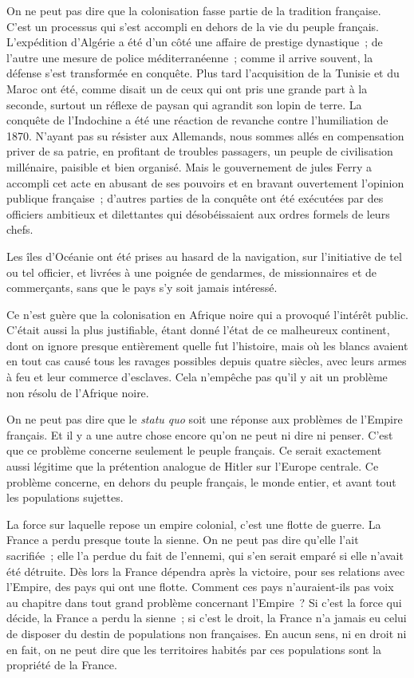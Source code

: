 \documentclass[french,twoside]{book} %
\begin{document}
On ne peut pas dire que la colonisation fasse partie de la tradition fran­çaise. C'est un processus qui s'est accompli en dehors de la vie du peuple français. L'expédition d'Algérie a été d'un côté une affaire de prestige dynastique ; de l'autre une mesure de police méditerranéenne ; comme il arrive souvent, la défense s'est transformée en conquête. Plus tard l'acquisition de la Tunisie et du Maroc ont été, comme disait un de ceux qui ont pris une grande part à la seconde, surtout un réflexe de paysan qui agrandit son lopin de terre. La conquête de l'Indochine a été une réaction de revanche contre l'humiliation de 1870. N'ayant pas su résister aux Allemands, nous sommes allés en compensation priver de sa patrie, en profitant de troubles passagers, un peuple de civilisation millénaire, paisible et bien organisé. Mais le gouvernement de jules Ferry a accompli cet acte en abusant de ses pouvoirs et en bravant ouvertement l'opinion publique française ; d'autres parties de la conquête ont été exécutées par des officiers ambitieux et dilettantes qui désobéissaient aux ordres formels de leurs chefs.\par
Les îles d'Océanie ont été prises au hasard de la navigation, sur l'initiative de tel ou tel officier, et livrées à une poignée de gendarmes, de missionnaires et de commerçants, sans que le pays s'y soit jamais intéressé.\par
Ce n'est guère que la colonisation en Afrique noire qui a provoqué l'intérêt public. C'était aussi la plus justifiable, étant donné l'état de ce malheureux continent, dont on ignore presque entièrement quelle fut l'histoire, mais où les blancs avaient en tout cas causé tous les ravages possibles depuis quatre siècles, avec leurs armes à feu et leur commerce d'esclaves. Cela n'empêche pas qu'il y ait un problème non résolu de l'Afrique noire.\par
On ne peut pas dire que le {\itshape statu quo} soit une réponse aux problèmes de l'Empire français. Et il y a une autre chose encore qu'on ne peut ni dire ni penser. C'est que ce problème concerne seulement le peuple français. Ce serait exactement aussi légitime que la prétention analogue de Hitler sur l'Europe centrale. Ce problème concerne, en dehors du peuple français, le monde entier, et avant tout les populations sujettes.\par
La force sur laquelle repose un empire colonial, c'est une flotte de guerre. La France a perdu presque toute la sienne. On ne peut pas dire qu'elle l'ait sacrifiée ; elle l'a perdue du fait de l'ennemi, qui s'en serait emparé si elle n'avait été détruite. Dès lors la France dépendra après la victoire, pour ses relations avec l'Empire, des pays qui ont une flotte. Comment ces pays n'auraient-ils pas voix au chapitre dans tout grand problème concernant l'Empire ? Si c'est la force qui décide, la France a perdu la sienne ; si c'est le droit, la France n'a jamais eu celui de disposer du destin de populations non françaises. En aucun sens, ni en droit ni en fait, on ne peut dire que les territoires habités par ces populations sont la propriété de la France.\par
\end{document}
